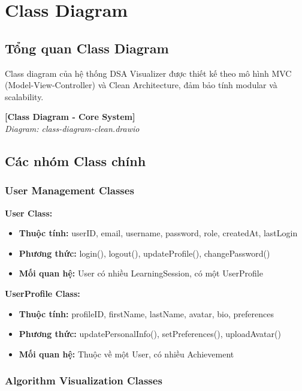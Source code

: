\section{Class Diagram}
\label{sec:class-diagram}

\subsection{Tổng quan Class Diagram}
\label{subsec:class-overview}

Class diagram của hệ thống DSA Visualizer được thiết kế theo mô hình MVC (Model-View-Controller) và Clean Architecture, đảm bảo tính modular và scalability.

\begin{center}
\textbf{[Class Diagram - Core System]}\\
\textit{Diagram: class-diagram-clean.drawio}
\end{center}

\subsection{Các nhóm Class chính}

\subsubsection{User Management Classes}

\textbf{User Class:}
\begin{itemize}
    \item \textbf{Thuộc tính:} userID, email, username, password, role, createdAt, lastLogin
    \item \textbf{Phương thức:} login(), logout(), updateProfile(), changePassword()
    \item \textbf{Mối quan hệ:} User có nhiều LearningSession, có một UserProfile
\end{itemize}

\textbf{UserProfile Class:}
\begin{itemize}
    \item \textbf{Thuộc tính:} profileID, firstName, lastName, avatar, bio, preferences
    \item \textbf{Phương thức:} updatePersonalInfo(), setPreferences(), uploadAvatar()
    \item \textbf{Mối quan hệ:} Thuộc về một User, có nhiều Achievement
\end{itemize}

\subsubsection{Algorithm Visualization Classes}

